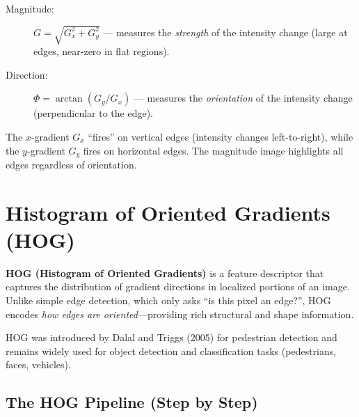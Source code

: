 \begin{description}
    \item[Magnitude:] $G = \sqrt{G_x^2 + G_y^2}$ — measures the \textit{strength} of the intensity change (large at edges, near-zero in flat regions).
    \item[Direction:] $\Phi = \arctan(G_y / G_x)$ — measures the \textit{orientation} of the intensity change (perpendicular to the edge).
\end{description}

\begin{remark}
The $x$-gradient $G_x$ ``fires'' on vertical edges (intensity changes left-to-right), while the $y$-gradient $G_y$ fires on horizontal edges. The magnitude image highlights all edges regardless of orientation.
\end{remark}

\section*{Histogram of Oriented Gradients (HOG)}

\textbf{HOG (Histogram of Oriented Gradients)} is a feature descriptor that captures the distribution of gradient directions in localized portions of an image. Unlike simple edge detection, which only asks ``is this pixel an edge?'', HOG encodes \textit{how edges are oriented}---providing rich structural and shape information.

HOG was introduced by Dalal and Triggs (2005) for pedestrian detection and remains widely used for object detection and classification tasks (pedestrians, faces, vehicles).

\subsection*{The HOG Pipeline (Step by Step)}

